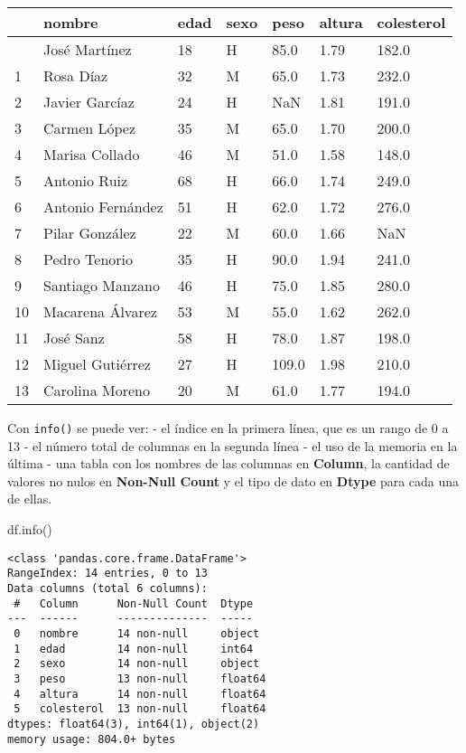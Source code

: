 \documentclass[
  letterpaper,
  DIV=11,
  numbers=noendperiod]{scrreprt}
\newenvironment{Shaded}{\begin{snugshade}}{\end{snugshade}}
\newcommand{\NormalTok}[1]{\textcolor[rgb]{0.00,0.23,0.31}{#1}}
\begin{document}
\begin{longtable}[]{@{}lllllll@{}}
\toprule\noalign{}
& nombre & edad & sexo & peso & altura & colesterol \\
\midrule\noalign{}
\endhead
\bottomrule\noalign{}
\endlastfoot
0 & José Martínez & 18 & H & 85.0 & 1.79 & 182.0 \\
1 & Rosa Díaz & 32 & M & 65.0 & 1.73 & 232.0 \\
2 & Javier Garcíaz & 24 & H & NaN & 1.81 & 191.0 \\
3 & Carmen López & 35 & M & 65.0 & 1.70 & 200.0 \\
4 & Marisa Collado & 46 & M & 51.0 & 1.58 & 148.0 \\
5 & Antonio Ruiz & 68 & H & 66.0 & 1.74 & 249.0 \\
6 & Antonio Fernández & 51 & H & 62.0 & 1.72 & 276.0 \\
7 & Pilar González & 22 & M & 60.0 & 1.66 & NaN \\
8 & Pedro Tenorio & 35 & H & 90.0 & 1.94 & 241.0 \\
9 & Santiago Manzano & 46 & H & 75.0 & 1.85 & 280.0 \\
10 & Macarena Álvarez & 53 & M & 55.0 & 1.62 & 262.0 \\
11 & José Sanz & 58 & H & 78.0 & 1.87 & 198.0 \\
12 & Miguel Gutiérrez & 27 & H & 109.0 & 1.98 & 210.0 \\
13 & Carolina Moreno & 20 & M & 61.0 & 1.77 & 194.0 \\
\end{longtable}

Con \texttt{info()} se puede ver: - el índice en la primera línea, que
es un rango de 0 a 13 - el número total de columnas en la segunda línea
- el uso de la memoria en la última - una tabla con los nombres de las
columnas en \textbf{Column}, la cantidad de valores no nulos en
\textbf{Non-Null Count} y el tipo de dato en \textbf{Dtype} para cada
una de ellas.

\begin{Shaded}
\begin{Highlighting}[]
\NormalTok{df.info()}
\end{Highlighting}
\end{Shaded}

\begin{verbatim}
<class 'pandas.core.frame.DataFrame'>
RangeIndex: 14 entries, 0 to 13
Data columns (total 6 columns):
 #   Column      Non-Null Count  Dtype  
---  ------      --------------  -----  
 0   nombre      14 non-null     object 
 1   edad        14 non-null     int64  
 2   sexo        14 non-null     object 
 3   peso        13 non-null     float64
 4   altura      14 non-null     float64
 5   colesterol  13 non-null     float64
dtypes: float64(3), int64(1), object(2)
memory usage: 804.0+ bytes
\end{verbatim}
\end{document}
